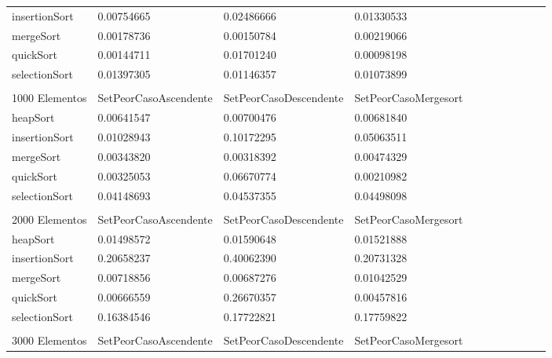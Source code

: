 \documentclass[article,a4paper]{article}
\begin{document}
\begin{table}[h]
\begin{adjustbox}{width=\textwidth,totalheight=\textheight,keepaspectratio}
\begin{tabular}{lllllllllll}
insertionSort   & 0.00754665            & 0.02486666             & 0.01330533           \\
mergeSort       & 0.00178736            & 0.00150784             & 0.00219066           \\
quickSort       & 0.00144711            & 0.01701240             & 0.00098198           \\
selectionSort   & 0.01397305            & 0.01146357             & 0.01073899           \\
                &                       &                        &                      \\
1000 Elementos  & SetPeorCasoAscendente & SetPeorCasoDescendente & SetPeorCasoMergesort \\
heapSort        & 0.00641547            & 0.00700476             & 0.00681840           \\
insertionSort   & 0.01028943            & 0.10172295             & 0.05063511           \\
mergeSort       & 0.00343820            & 0.00318392             & 0.00474329           \\
quickSort       & 0.00325053            & 0.06670774             & 0.00210982           \\
selectionSort   & 0.04148693            & 0.04537355             & 0.04498098           \\
                &                       &                        &                      \\
2000 Elementos  & SetPeorCasoAscendente & SetPeorCasoDescendente & SetPeorCasoMergesort \\
heapSort        & 0.01498572            & 0.01590648             & 0.01521888           \\
insertionSort   & 0.20658237            & 0.40062390             & 0.20731328           \\
mergeSort       & 0.00718856            & 0.00687276             & 0.01042529           \\
quickSort       & 0.00666559            & 0.26670357             & 0.00457816           \\
selectionSort   & 0.16384546            & 0.17722821             & 0.17759822           \\
                &                       &                        &                      \\
3000 Elementos  & SetPeorCasoAscendente & SetPeorCasoDescendente & SetPeorCasoMergesort \\

\end{tabular}
\end{adjustbox}
\end{table}
\end{document}

